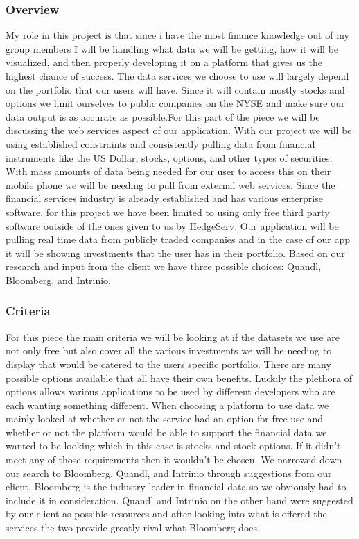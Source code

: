 \documentclass[onecolumn, draftclsnofoot,10pt, compsoc]{IEEEtran}
\begin{document}
\subsubsection{Overview}
My role in this project is that since i have the most finance knowledge out of my group members I will be handling what data we will be getting, how it will be visualized, and then properly developing it on a platform that gives us the highest chance of success. The data services we choose to use will largely depend on the portfolio that our users will have. Since it will contain mostly stocks and options we limit ourselves to public companies on the NYSE and make sure our data output is as accurate as possible.For this part of the piece we will be discussing the web services aspect of our application. With our project we will be using established constraints and consistently pulling data from financial instruments like the US Dollar, stocks, options, and other types of securities. With mass amounts of data being needed for our user to access this on their mobile phone we will be needing to pull from external web services. Since the financial services industry is already established and has various enterprise software, for this project we have been limited to using only free third party software outside of the ones given to us by HedgeServ. Our application will be pulling real time data from publicly traded companies and in the case of our app it will be showing investments that the user has in their portfolio. Based on our research and input from the client we have three possible choices: Quandl, Bloomberg, and Intrinio.


\subsubsection{Criteria}
For this piece the main criteria we will be looking at if the datasets we use are not only free but also cover all the various investments we will be needing to display that would be catered to the users specific portfolio. There are many possible options available that all have their own benefits. Luckily the plethora of options allows various applications to be used by different developers who are each wanting something different. When choosing a platform to use data we mainly looked at whether or not the service had an option for free use and whether or not the platform would be able to support the financial data we wanted to be looking which in this case is stocks and stock options. If it didn’t meet any of those requirements then it wouldn’t be chosen. We narrowed down our search to Bloomberg, Quandl, and Intrinio through suggestions from our client. Bloomberg is the industry leader in financial data so we obviously had to include it in consideration. Quandl and Intrinio on the other hand were suggested by our client as possible resources and after looking into what is offered the services the two provide greatly rival what Bloomberg does. 
\end{document}
